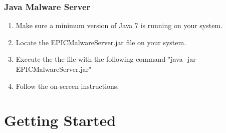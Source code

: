 \documentclass{article}
\begin{document}
\subsubsection{Java Malware Server}
\begin{enumerate}
\item Make sure a minimum version of Java 7 is running on your system.
\item Locate the EPICMalwareServer.jar file on your system.
\item Execute the the file with the following command "java -jar EPICMalwareServer.jar"
\item Follow the on-screen instructions.
\end{enumerate}

\newpage
\section{Getting Started}
\end{document}
